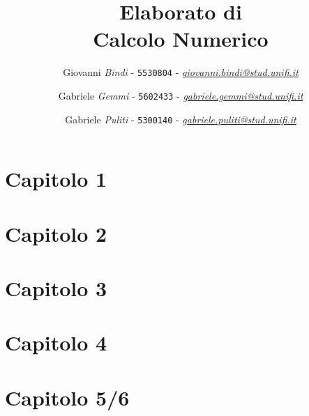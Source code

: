 \documentclass[a4paper]{article}
\begin{document}
\title{Elaborato di\\ \textbf{Calcolo Numerico}}

\author{Giovanni \emph{Bindi} - \texttt{5530804} - \href{mailto:giovanni.bindi@stud.unifi.it}{\textit{giovanni.bindi@stud.unifi.it}}
   \and Gabriele \emph{Gemmi} - \texttt{5602433} - \href{mailto:gabriele.gemmi@stud.unifi.it}{\textit{gabriele.gemmi@stud.unifi.it}}
   \and Gabriele \emph{Puliti} - \texttt{5300140} - \href{mailto:gabriele.puliti@stud.unifi.it}{\textit{gabriele.puliti@stud.unifi.it}}}

\maketitle

\tableofcontents


\newpage
\section{\textbf{Capitolo 1}}


\newpage
\section{\textbf{Capitolo 2}}


\newpage
\section{\textbf{Capitolo 3}}


\newpage
\section{\textbf{Capitolo 4}}


\newpage
\section{\textbf{Capitolo 5/6}}

\end{document}
